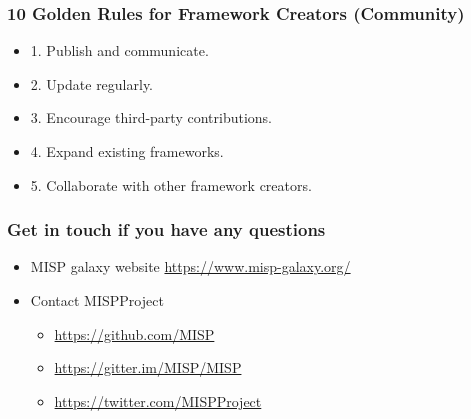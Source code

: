 \begin{frame}
        \frametitle{10 Golden Rules for Framework Creators (Community)}
        \begin{itemize}
            \item 1. Publish and communicate.
            \item 2. Update regularly.
            \item 3. Encourage third-party contributions.
            \item 4. Expand existing frameworks.
            \item 5. Collaborate with other framework creators.
        \end{itemize}
\end{frame}


\begin{frame}
  \frametitle{Get in touch if you have any questions}
  \begin{itemize}
    \item MISP galaxy website \url{https://www.misp-galaxy.org/}
    \item Contact MISPProject 
    \begin{itemize}
      \item \url{https://github.com/MISP}
      \item \url{https://gitter.im/MISP/MISP}
      \item \url{https://twitter.com/MISPProject}
    \end{itemize}
  \end{itemize}
\end{frame}
